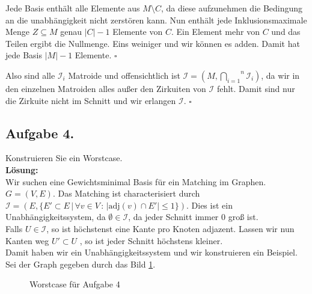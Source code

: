 \documentclass[11pt,a4paper,ngerman]{article}
\begin{document}
Jede Basis enthält alle Elemente
aus $M \setminus C$, da diese aufzunehmen die Bedingung an die unabhängigkeit
nicht zerstören kann. Nun enthält jede Inklusionsmaximale Menge $Z \subseteq M$
genau $|C| - 1$ Elemente von $C$. Ein Element mehr von $C$ und das Teilen
ergibt die Nullmenge. Eins weiniger und wir können es adden. Damit
hat jede Basis $|M| - 1$ Elemente. 
\mbox{}\hfill$\square$

Also sind alle $\mathcal{I}_i$ Matroide und offensichtlich ist
$\mathcal{I} = (M, \overset{n}{\underset{i=1}{\bigcap}} \mathcal{I}_i)$,
da wir in den einzelnen Matroiden alles außer den Zirkuiten von $\mathcal{I}$ 
fehlt. Damit sind nur die Zirkuite nicht im Schnitt und wir erlangen $\mathcal{I}$.
\mbox{}\hfill$\square$

\pagebreak

\subsection*{Aufgabe 4.}
Konstruieren Sie ein Worstcase.\\

\textbf{Lösung:}\\

Wir suchen eine Gewichtsminimal Basis für ein Matching im Graphen.
$G = (V,E)$.
Das Matching ist characterisiert durch
$\mathcal{I} = (E, \{ E' \subset E \, | \, \forall v \in V \, : \, |\text{adj}(v) \cap E'| \leq 1\} )$.
Dies ist ein Unabhängigkeitssystem, da
$\emptyset \in \mathcal{I}$, da jeder Schnitt immer $0$ groß ist.\\
Falls $U \in \mathcal{I}$, so ist höchstenst eine Kante pro Knoten adjazent. Lassen wir nun Kanten weg $U' \subset U$
, so ist jeder Schnitt höchstens kleiner.\\

Damit haben wir ein Unabhängigkeitssystem und wir konstruieren ein Beispiel.\\

Sei der Graph gegeben durch das Bild \ref{disk:ueb6:wc}.

\begin{figure}[h!]
    \centering
    \caption{Worstcase für Aufgabe 4}
    \label{disk:ueb6:wc}
\end{figure}
\end{document}
